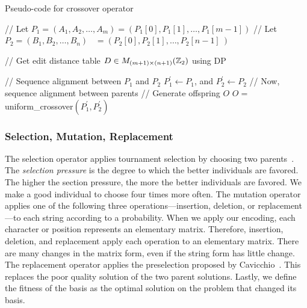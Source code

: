 \begin{algorithm}[!ht] 
\caption{Pseudo-code for crossover operator}
\label{algo:crossover}
// Let $ P_1 = (A_1, A_2, \ldots, A_m ) = (P_1[0], P_1[1], \ldots, P_1[m-1]) $\;
// Let $ P_2 = (B_1, B_2, \ldots, B_n ) \, \text{  } = (P_2[0], P_2[1], \ldots, P_2[n-1]\:) $\;

// Get edit distance table $ D \in M_{(m+1) \times (n+1)}(\mathbb{Z}_2) $ using DP\;

// Sequence alignment between $ P_1 $ and $ P_2 $\;
$ P_1^\prime \gets P_1 $, and $ P_2^\prime \gets P_2 $\;
// Now, sequence alignment between parents\;
// Generate offspring $ O $\;
$ O = $ uniform\_{}crossover$ ( P_1^\prime, P_2^\prime ) $\;
\end{algorithm}



\subsubsection{Selection, Mutation, Replacement}
The selection operator applies tournament selection by choosing two parents~\cite{miller1995genetic}.
The \textit{selection pressure} is the degree to which the better individuals are favored. The higher the section pressure, the more the better individuals are favored.
We make a good individual to choose four times more often.
The mutation operator applies one of the following three operations---insertion, deletion, or replacement---to each string according to a probability.
When we apply our encoding, each character or position represents an elementary matrix.
Therefore, insertion, deletion, and replacement apply each operation to an elementary matrix.
There are many changes in the matrix form, even if the string form has little change.
The replacement operator applies the preselection proposed by Cavicchio~\cite{cavicchio1970adaptive}.
This replaces the poor quality solution of the two parent solutions.
Lastly, we define the fitness of the basis as the optimal solution on the problem that changed its basis.



